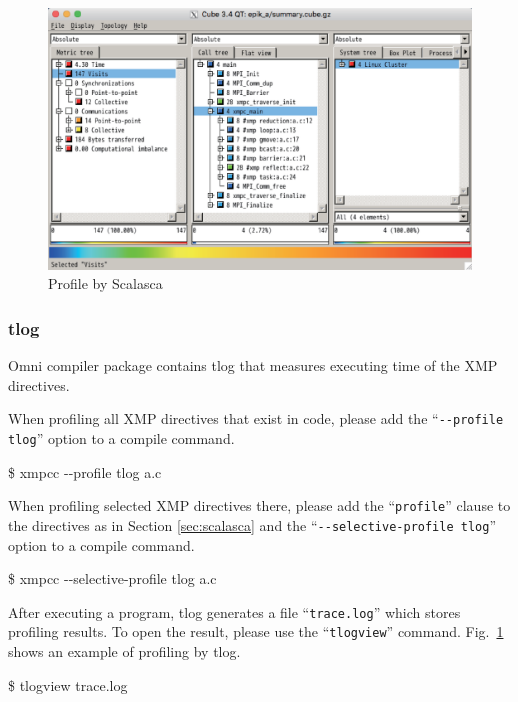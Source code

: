 \documentclass[graybox]{svmult}
\begin{document}
\begin{figure}[h]
\sidecaption
\includegraphics[scale=.43]{img/scalasca.eps}
\caption{Profile by Scalasca\cite{omni}} \label{fig:scalasca}
\end{figure}

\subsubsection{tlog}
Omni compiler package contains tlog that measures executing time of the XMP directives.

When profiling all XMP directives that exist in code, please add the ``{\tt {-}{-}profile tlog}'' option to a compile command.

\begin{svgraybox}
\$ xmpcc {-}{-}profile tlog a.c
\end{svgraybox}

When profiling selected XMP directives there, 
please add the ``{\tt profile}'' clause to the directives as in Section \ref{sec:scalasca} and  the ``{\tt {-}{-}selective-profile tlog}'' option to a compile command.

\begin{svgraybox}
\$ xmpcc {-}{-}selective-profile tlog a.c
\end{svgraybox}

After executing a program,
tlog generates a file ``{\tt trace.log}'' which stores profiling results. 
To open the result, 
please use the ``{\tt tlogview}'' command.
Fig.~\ref{fig:scalasca} shows an example of profiling by tlog.

\begin{svgraybox}
\$ tlogview trace.log
\end{svgraybox}
\end{document}
